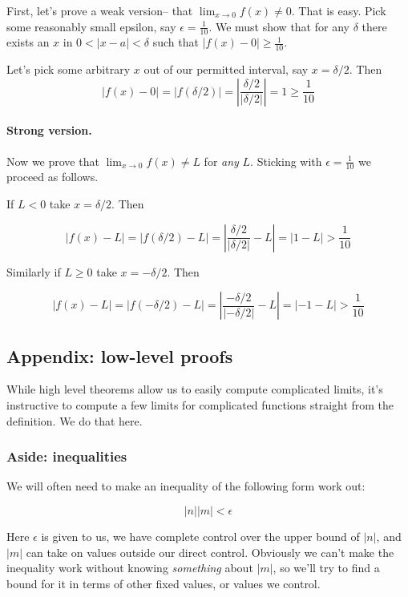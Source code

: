 First, let's prove a weak version-- that $\lim_{x\to 0}f(x)\neq 0$. That is
easy. Pick some reasonably small epsilon, say $\epsilon=\frac{1}{10}$. We
must show that for any $\delta$ there exists an $x$ in
$0<|x-a|<\delta$ such that $|f(x)-0|\geq \frac{1}{10}$.

\vs

Let's pick some arbitrary $x$ out of our permitted interval, say $x=\delta/2$. Then
\[|f(x)-0|=|f(\delta/2)|=\left|\frac{\delta/2}{|\delta/2|}\right|=1\geq\frac{1}{10}\]


\paragraph{Strong version.}

Now we prove that $\lim_{x\to 0}f(x)\neq L$ for \textit{any} $L$. Sticking
with $\epsilon=\frac{1}{10}$ we proceed as follows.

\vs

If $L<0$ take $x=\delta/2$. Then

\[|f(x)-L|=|f(\delta/2)-L|=\left|\frac{\delta/2}{|\delta/2|}-L\right|=|1-L|>\frac{1}{10}\]

Similarly if $L\geq 0$ take $x=-\delta/2$. Then

\[|f(x)-L|=|f(-\delta/2)-L|=\left|\frac{-\delta/2}{|-\delta/2|}-L\right|=|-1-L|>\frac{1}{10}\]

\subsection{Appendix: low-level proofs}

While high level theorems allow us to easily compute complicated
limits, it's instructive to compute a few limits for complicated
functions straight from the definition. We do that here.

\subsubsection*{Aside: inequalities}

We will often need to make an inequality of the following form work out:

\[|n||m|<\epsilon\]

Here $\epsilon$ is given to us, we have complete control over the upper bound
of $|n|$, and $|m|$ can take on values outside our direct control.
Obviously we can't make the inequality work without knowing
\textit{something} about $|m|$, so we'll try to find a bound for it in
terms of other fixed values, or values we control.

